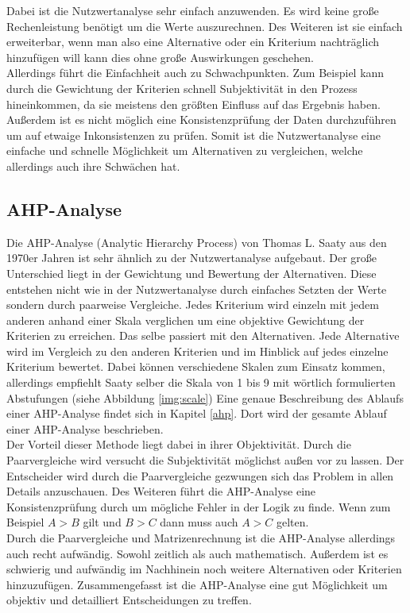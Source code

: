 Dabei ist die Nutzwertanalyse sehr einfach anzuwenden. Es wird keine große Rechenleistung benötigt um die Werte auszurechnen. Des Weiteren ist sie einfach erweiterbar, wenn man also eine Alternative oder ein Kriterium nachträglich hinzufügen will kann dies ohne große Auswirkungen geschehen.\\
Allerdings führt die Einfachheit auch zu Schwachpunkten. Zum Beispiel kann durch die Gewichtung der Kriterien schnell Subjektivität in den Prozess hineinkommen, da sie meistens den größten Einfluss auf das Ergebnis haben. Außerdem ist es nicht möglich eine Konsistenzprüfung der Daten durchzuführen um auf etwaige Inkonsistenzen zu prüfen. Somit ist die Nutzwertanalyse eine einfache und schnelle Möglichkeit um Alternativen zu vergleichen, welche allerdings auch ihre Schwächen hat. 
\subsection{AHP-Analyse}
Die AHP-Analyse (Analytic Hierarchy Process) von Thomas L. Saaty aus den 1970er Jahren ist sehr ähnlich zu der Nutzwertanalyse aufgebaut. Der große Unterschied liegt in der Gewichtung und Bewertung der Alternativen. Diese entstehen nicht wie in der Nutzwertanalyse durch einfaches Setzten der Werte sondern durch paarweise Vergleiche. Jedes Kriterium wird einzeln mit jedem anderen anhand einer Skala verglichen um eine objektive Gewichtung der Kriterien zu erreichen. Das selbe passiert mit den Alternativen. Jede Alternative wird im Vergleich zu den anderen Kriterien und im Hinblick auf jedes einzelne Kriterium bewertet. Dabei können verschiedene Skalen zum Einsatz kommen, allerdings empfiehlt Saaty selber die Skala von 1 bis 9 mit wörtlich formulierten Abstufungen (siehe Abbildung \ref{img:scale}) Eine genaue Beschreibung des Ablaufs einer AHP-Analyse findet sich in Kapitel \ref{ahp}. Dort wird der gesamte Ablauf einer AHP-Analyse beschrieben. \\Der Vorteil dieser Methode liegt dabei in ihrer Objektivität. Durch die Paarvergleiche wird versucht die Subjektivität möglichst außen vor zu lassen. Der Entscheider wird durch die Paarvergleiche gezwungen sich das Problem in allen Details anzuschauen. Des Weiteren führt die AHP-Analyse eine Konsistenzprüfung durch um mögliche Fehler in der Logik zu finde. Wenn zum Beispiel $A > B$ gilt und $B > C$ dann muss auch $A > C$ gelten.\\
Durch die Paarvergleiche und Matrizenrechnung ist die AHP-Analyse allerdings auch recht aufwändig. Sowohl zeitlich als auch mathematisch. Außerdem ist es schwierig und aufwändig im Nachhinein noch weitere Alternativen oder Kriterien hinzuzufügen.
Zusammengefasst ist die AHP-Analyse eine gut Möglichkeit um objektiv und detailliert Entscheidungen zu treffen.
\\
